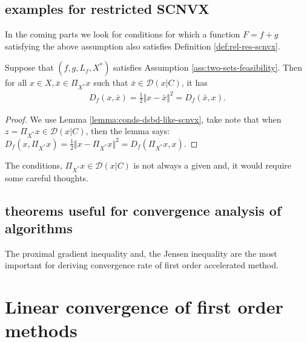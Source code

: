 \documentclass[12pt]{article}
\begin{document}
    \subsection{examples for restricted SCNVX}
        In the coming parts we look for conditions for which a function $F = f + g$ satisfying the above assumption also satisfies Definition \ref{def:rel-res-scnvx}. 
        \begin{theorem}\label{thm:example-rqua}
            Suppose that $(f, g, L_f, X^*)$ satisfies Assumption \ref{ass:two-sets-feasibility}. 
            Then for all $x\in X, \bar x \in \Pi_{X^*} x$ such that $\bar x \in \mathcal D(x | C)$, it has 
            \begin{align*}
                D_f(x, \bar x) = \frac{1}{2}\Vert x - \bar x \Vert^2 = D_f(\bar x, x). 
            \end{align*}
        \end{theorem}
        \begin{proof}
            We use Lemma \ref{lemma:conds-dsbd-like-scnvx}, take note that when $z = \Pi_{X^*} x \in \mathcal D(x | C)$, then the lemma says: $D_f(x, \Pi_{X^*}x) = \frac{1}{2}\Vert x - \Pi_{X^*}x\Vert^2= D_f(\Pi_{X^*}x, x)$. 
        \end{proof}
        \begin{remark}
            The conditions, $\Pi_{X^*}x \in \mathcal D(x | C)$ is not always a given and, it would require some careful thoughts. 
        \end{remark}
    \subsection{theorems useful for convergence analysis of algorithms}
        The proximal gradient inequality and, the Jensen inequality are the most important for deriving convergence rate of first order accelerated method. 



\section{Linear convergence of first order methods}
    

    






\end{document}
